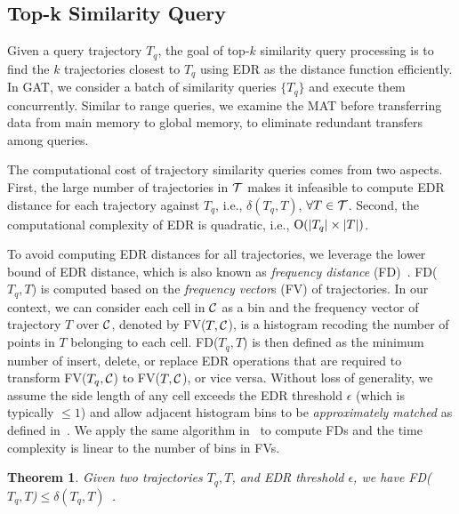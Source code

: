 \documentclass[10pt,conference,letterpaper]{IEEEtran}
\newcommand{\frname}{GAT\xspace }
\newcommand{\alltraj}{{{\cal T}}\xspace}
\newcommand{\edr}{{\delta}\xspace}
\newcommand{\allcell}{{\cal C}\xspace}
\newcommand{\bigoh}{{\rm O}\xspace}
\newtheorem{theorem}{Theorem}
\begin{document}

\subsection{Top-k Similarity Query}


Given a query trajectory $T_q$, the goal of top-$k$ similarity query processing is to find the $k$ trajectories closest to $T_q$ using EDR as the distance function efficiently.
In \frname, we consider a batch of similarity queries $\{T_q\}$ and execute them concurrently.
Similar to range queries, we examine the MAT before transferring data from main memory to global memory, to eliminate redundant transfers among queries.


The computational cost of trajectory similarity queries comes from two aspects. First, the large number of trajectories in $\alltraj$ makes it infeasible to compute EDR distance for each trajectory against $T_q$, i.e., $\edr(T_q, T)$, $\forall T\in\alltraj$. Second, the computational complexity of EDR is quadratic, i.e., $\bigoh(|T_q|\times|T|)$.

To avoid computing EDR distances for all trajectories, we leverage the lower bound of EDR distance, which is also known as \emph{frequency distance} (FD)~\cite{DBLP:conf/sigmod/ChenOO05}.
FD($T_q, T$) is computed based on the \emph{frequency vector}s (FV) of trajectories. In our context, we can consider each cell in $\allcell$ as a bin and the frequency vector of trajectory $T$ over $\allcell$, denoted by FV($T, \allcell$), is a histogram recoding the number of points in $T$ belonging to each cell.
FD($T_q, T$) is then defined as the minimum number of insert, delete, or replace EDR operations that are required to transform FV($T_q, \allcell$) to FV($T,\allcell$), or vice versa. Without loss of generality, we assume the side length of any cell exceeds the EDR threshold $\epsilon$ (which is typically $\leq 1$) and allow adjacent histogram bins to be \emph{approximately matched} as defined in~\cite{DBLP:conf/sigmod/ChenOO05}.
We apply the same algorithm in~\cite{DBLP:conf/sigmod/ChenOO05} to compute FDs and the time complexity is linear to the number of bins in FVs.

\begin{theorem}\label{the:lb}
	Given two trajectories $T_q, T$, and EDR threshold $\epsilon$, we have FD($T_q, T$)$\leq \edr(T_q, T)$~\cite{DBLP:conf/sigmod/ChenOO05}.
\end{theorem}
\end{document}
